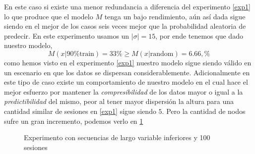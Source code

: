	\begin{table}[h] 	\label{tabl-exp-1-frec}
		\centering
		\caption{Tabla de frecuencia experimento 1}
	\end{table}


			
	En este caso si existe una menor redundancia a diferencia del experimento \ref{exp1} lo que produce que el modelo $M$ tenga un bajo rendimiento, aún así dada sigue siendo en el mejor de los casos seis veces mejor que la probabilidad aleatoria de predecir. En este experimento usamos un $|\sigma| =15$, por ende tenemos que dado nuestro modelo,
	\begin{equation}\label{expResult2}
		M( x | \mbox{90\% train}  ) = 33 \% \geq M( x | \mbox{random}  ) = 6.66 ,\% 
	\end{equation} como hemos visto en el experimento \ref{exp1} nuestro modelo sigue siendo válido en un escenario en que los datos se dispersan considerablemente. 
	Adicionalmente en este tipo de caso existe un comportamiento de nuestro modelo en el cual hace el mejor esfuerzo por mantener la \emph{compresibilidad} de los datos mayor o igual a la \emph{predictibilidad} del mismo, peor al tener mayor dispersión la altura para una cantidad similar de sesiones en \ref{exp1} sigue siendo $5$. Pero la cantidad de nodos sufre un gran incremento, podemos verlo en \ref{fig:exp-largo-variable-inf}
	
	
	
	\begin{figure}[h] 
		\centering
		
		\caption{Experimento con secuencias de largo variable inferiores y 100 sesiones}
		\label{fig:exp-largo-variable-inf}
	\end{figure}
	
